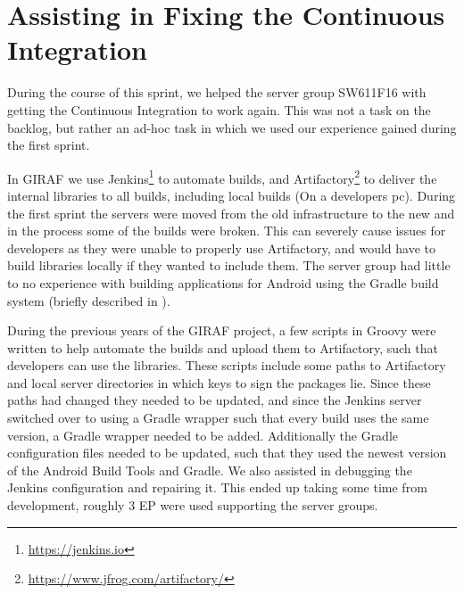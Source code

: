 \section{Assisting in Fixing the Continuous Integration}
During the course of this sprint, we helped the server group SW611F16 with getting the Continuous Integration  to work again. 
This was not a task on the backlog, but rather an ad-hoc task in which we used our experience gained during the first sprint.  

In GIRAF we use Jenkins\footnote{\url{https://jenkins.io}} to automate builds, and Artifactory\footnote{\url{https://www.jfrog.com/artifactory/}} to deliver the internal libraries to all builds, including local builds (On a developers pc). 
During the first sprint the servers were moved from the old infrastructure to the new and in the process some of the builds were broken. 
This can severely cause issues for developers as they were unable to properly use Artifactory, and would have to build libraries locally if they wanted to include them.
The server group had little to no experience with building applications for Android using the Gradle build system (briefly described in ). 

During the previous years of the GIRAF project, a few scripts in Groovy were written to help automate the builds and upload them to Artifactory, such that developers can use the libraries.
These scripts include some paths to Artifactory and local server directories in which keys to sign the packages lie. 
Since these paths had changed they needed to be updated, and since the Jenkins server switched over  to using a Gradle wrapper such that every build uses the same version, a Gradle wrapper needed to be added. 
Additionally the Gradle configuration files needed to be updated, such that they used the newest version of the Android Build Tools and Gradle. 
We also assisted in debugging the Jenkins configuration and repairing it. 
This ended up taking some time from development, roughly 3 EP were used supporting the server groups.
